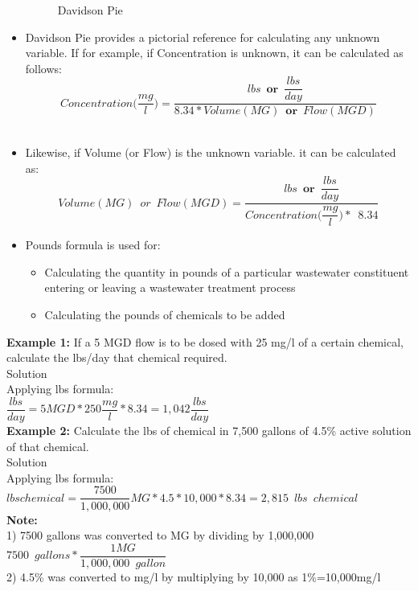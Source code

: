 \begin{itemize}
\begin{figure}[h]
\caption{Davidson Pie}
\end{figure}
\vspace{0.2cm}
\item Davidson Pie provides a pictorial reference for calculating any unknown variable.  If for example, if Concentration is unknown, it can be calculated as follows: \\$$Concentration\Big(\dfrac{mg}{l}\Big)=\dfrac{lbs \enspace \textbf{or} \enspace \dfrac{lbs}{day}}{8.34*Volume(MG) \enspace \textbf{or} \enspace Flow (MGD)}$$\\
\vspace{0.2cm}
\item Likewise, if Volume (or Flow) is the unknown variable. it can be calculated as:  \\$$Volume (MG) \enspace or \enspace Flow(MGD)=\dfrac{lbs \enspace \textbf{or} \enspace \dfrac{lbs}{day}}{Concentration\Big(\dfrac{mg}{l}\Big)* \enspace 8.34  }$$
\vspace{0.2cm}
\item Pounds formula is used for:
\begin{itemize}
\item Calculating the quantity in pounds of a particular wastewater constituent entering or leaving a wastewater treatment process
\item Calculating the pounds of chemicals to be added\\
\end{itemize}
\end{itemize}


\textbf{Example 1:} If a 5 MGD flow is to be dosed with 25 mg/l of a certain chemical, calculate the lbs/day that chemical required.\\

Solution\\

Applying lbs formula:\\
$\dfrac{lbs}{day}=5 MGD *250\dfrac{mg}{l}*8.34 = \boxed{1,042\dfrac{lbs}{day}}$
\\
\vspace{6pt}
\textbf{Example 2:} Calculate the lbs of chemical in 7,500 gallons of 4.5\% active solution of that chemical.\\
Solution\\
Applying lbs formula:\\
$lbs chemical = \dfrac{7500}{1,000,000}MG * 4.5*10,000 *8.34 = \boxed{2,815 \enspace lbs \enspace chemical}$\\
\textbf{Note:}\\  
1) 7500 gallons was converted to MG by dividing by 1,000,000\\
$7500 \enspace gallons * \dfrac{1 MG}{1,000,000 \enspace gallon}$\\
2) 4.5\% was converted to mg/l by multiplying by 10,000 as 1\%=10,000mg/l

